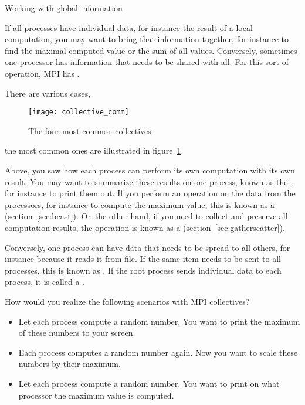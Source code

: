 
 {Working with global information}

If all processes have individual data, for instance the result
of a local computation, you may want to bring that information
together, for instance to find the maximal computed value
or the sum of all values. Conversely, sometimes one processor has
information that needs to be shared with all.
For this sort of operation, MPI
has .

There are various cases,
\begin{figure}[ht]
  \texttt{[image: collective\_comm]}  
  \caption{The four most common collectives}
  \label{fig:collectives}
\end{figure}
the most common ones are illustrated in figure~\ref{fig:collectives}.

Above, you saw how each process can perform its own computation
with its own result. You may want to summarize these results
on one process, known as the ,
for instance to print them out.
If you perform an operation on the data from the processors,
for instance to compute the maximum value, this is known
as a  (section~\ref{sec:bcast}).
On the other hand, if you need to collect and preserve
all computation results, the operation is known
as a  (section~\ref{sec:gatherscatter}).

Conversely, one process can have data that needs to be
spread to all others, for instance because it reads it from file.
If the same item needs to be sent to all processes, this
is known as .
If the root process sends individual data to each process,
it is called a .

\begin{exercise}
  \label{ex:collective-cases}
  How would you realize the following scenarios with MPI collectives?
  \begin{itemize}
  \item Let each process compute a random number. You want to print the
    maximum of these numbers to your screen.
  \item Each process computes a random number again. Now you want to
    scale these numbers by their maximum. 
  \item Let each process compute a random number. You want to print on what processor the
    maximum value is computed. 
  \end{itemize}
\end{exercise}

